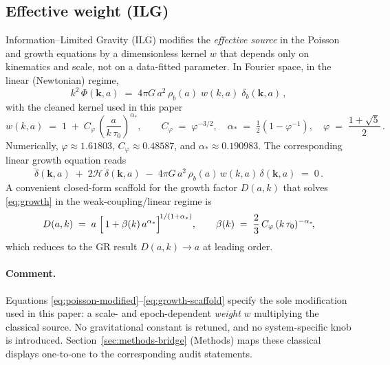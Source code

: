 \documentclass[12pt,a4paper]{article}
\begin{document}
\subsection{Effective weight (ILG)}
Information–Limited Gravity (ILG) modifies the \emph{effective source} in the Poisson and growth equations by a dimensionless kernel \(w\) that depends only on kinematics and scale, not on a data-fitted parameter. In Fourier space, in the linear (Newtonian) regime,
\begin{equation}
  k^2\,\Phi(\mathbf{k},a)
  \;=\;
  4\pi G\,a^2\,\rho_b(a)\;w(k,a)\;\delta_b(\mathbf{k},a)\,,
  \label{eq:poisson-modified}
\end{equation}
with the cleaned kernel used in this paper
\begin{equation}
  w(k,a) \;=\; 1 \;+\; C_\varphi\,
  \left(\frac{a}{k\,\tau_0}\right)^{\alpha_*}\!,
  \qquad
  C_\varphi \;=\; \varphi^{-3/2},\quad
  \alpha_* \;=\; \tfrac12\!\left(1-\varphi^{-1}\right),
  \quad
  \varphi \;=\; \frac{1+\sqrt{5}}{2}\,.
  \label{eq:wka}
\end{equation}
Numerically, \(\varphi\approx1.61803\), \(C_\varphi\approx0.48587\), and \(\alpha_*\approx0.190983\). The corresponding linear growth equation reads
\begin{equation}
  \ddot{\delta}(\mathbf{k},a)\;+\;2\mathcal{H}\,\dot{\delta}(\mathbf{k},a)
  \;-\;4\pi G\,a^2\,\rho_b(a)\,w(k,a)\,\delta(\mathbf{k},a)
  \;=\; 0\,.
  \label{eq:growth}
\end{equation}
A convenient closed-form scaffold for the growth factor \(D(a,k)\) that solves \eqref{eq:growth} in the weak-coupling/linear regime is
\begin{equation}
  D(a,k) \;=\; a\;\Bigl[\,1+\beta(k)\,a^{\alpha_*}\Bigr]^{\!1/(1+\alpha_*)},
  \qquad
  \beta(k) \;=\; \frac{2}{3}\,C_\varphi\,(k\,\tau_0)^{-\alpha_*}\!,
  \label{eq:growth-scaffold}
\end{equation}
which reduces to the GR result \(D(a,k)\to a\) at leading order.

\paragraph{Comment.}
Equations \eqref{eq:poisson-modified}–\eqref{eq:growth-scaffold} specify the sole modification used in this paper: a scale- and epoch-dependent \emph{weight} \(w\) multiplying the classical source. No gravitational constant is retuned, and no system-specific knob is introduced. Section~\ref{sec:methods-bridge} (Methods) maps these classical displays one-to-one to the corresponding audit statements.
\end{document}
